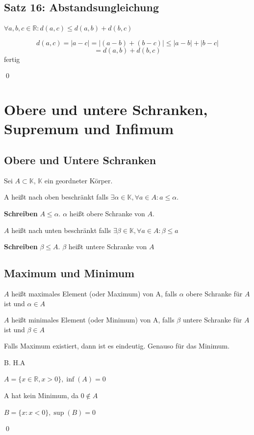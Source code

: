 \documentclass[fleqn]{scrbook}
\renewenvironment{proof}{{\bfseries Beweis }}{\qed}
\begin{document}
\subsection{Satz 16: Abstandsungleichung}

$\forall a,b,c \in \mathbb{R}: d(a,c) \leq d(a,b)+d(b,c)$

\begin{proof}

\[d(a,c)=|a-c|=|(a-b)+(b-c)| \leq |a-b|+|b-c|\]
\[=d(a,b)+d(b,c)\]
fertig

\end{proof}

\section{Obere und untere Schranken, Supremum und Infimum}

\subsection{Obere und Untere Schranken}

Sei $A \subset \mathbb{K}$, $\mathbb{K}$ ein geordneter Körper.

A heißt nach oben beschränkt falls $ \exists \alpha \in \mathbb{K}, \forall a \in A : a \leq \alpha$.

\textbf{Schreiben} $A \leq \alpha$. $\alpha$ heißt obere Schranke von $A$.

$A$ heißt nach unten beschränkt falls $\exists \beta \in \mathbb{K},\forall a \in A: \beta \leq a$

\textbf{Schreiben} $\beta \leq A$. $\beta$ heißt untere Schranke von $A$

\subsection{Maximum und Minimum}

$A$ heißt maximales Element (oder Maximum) von A, falls $\alpha$ obere 
Schranke für $A$ ist und $\alpha \in A$

$A$ heißt minimales Element (oder Minimum) von A, falls $\beta$ untere Schranke für $A$ ist und $\beta \in A$

\begin{proof}
Falls Maximum existiert, dann ist es eindeutig. Genauso für das Minimum. 

B. \quad H.A %

$A=\{x \in \mathbb{R}, x>0\}, \inf(A)=0$

A hat kein Minimum, da $0 \notin A$

$B=\{x:x<0\}, \sup(B)=0$

\end{proof}
\end{document}

